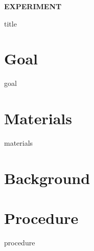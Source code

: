 \documentclass[cover.tex]{subfiles}
\begin{document}
 
\begin{refsection}


\hfill\vspace{0.2cm}\begin{center}{\large \bfseries EXPERIMENT {\thesection}\par\Huge
 {title}
 \\[5pt] \par}\vspace{0.2cm}\end{center}\par\noindent
 
 
\section*{Goal}
{goal}
\section*{Materials}
{materials}
\section*{Background}

\printbibliography[heading=subbibliography]
\section*{Procedure}
{procedure}%







\end{refsection}
\end{document}
